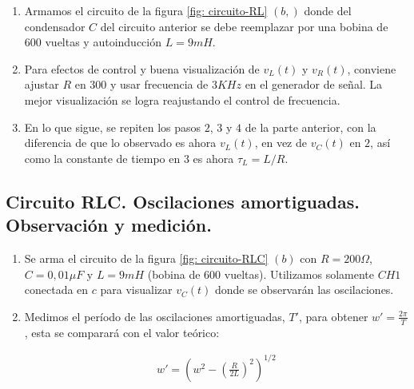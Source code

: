 \documentclass[]{article}
\begin{document}
\begin{enumerate}
      \item Armamos el circuito de la figura \ref{fig: circuito-RL} $(b,)$ donde del condensador $C$ del circuito anterior se debe reemplazar por una bobina de $600$ vueltas y autoinducción $L = 9 mH$.

      \item Para efectos de control y buena visualización de $v_L(t)$ y $v_R(t)$, conviene ajustar $R$ en $300$ y usar frecuencia de $3 KHz$ en el generador de señal. La mejor visualización se logra reajustando
      el control de frecuencia.
      
      \item En lo que sigue, se repiten los pasos $2$, $3$ y $4$ de la parte anterior, con la diferencia de que lo observado es ahora $v_L (t)$, en vez de $v_C (t)$ en $2$, así como la constante de tiempo en $3$ 
      es ahora $\tau_L = L/R$.
\end{enumerate}


\subsection*{\textbf{Circuito RLC. Oscilaciones amortiguadas. Observación y medición.}}
\begin{enumerate}
      \item Se arma el circuito de la figura \ref{fig: circuito-RLC} $(b)$ con $R = 200\Omega$, $C = 0,01 \mu F$ y $L = 9 mH$ (bobina de $600$ vueltas). Utilizamos solamente $CH1$ conectada en $c$ para visualizar $v_C(t)$ donde se 
      observarán las oscilaciones. 

      
      \item Medimos el período de las oscilaciones amortiguadas, $T'$, para obtener $w' = \frac{2 \pi}{T}$, esta  se comparará con el valor teórico:
      
      \begin{align*}
            w' = \left(w^2 - \left(\frac{R}{2L}\right)^2\right)^{1/2}
      \end{align*}
\end{enumerate}
\end{document}
